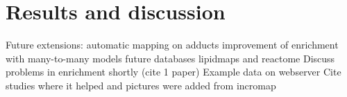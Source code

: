 \documentclass[final,5p,times,twocolumn]{elsarticle}
\begin{document}
\section{Results and discussion}

Future extensions: automatic mapping on adducts
improvement of enrichment with many-to-many models
future databases lipidmaps\cite{Sud2007} and reactome \cite{Eustachio2011}
Discuss problems in enrichment shortly (cite 1 paper)
Example data on webserver
Cite studies where it helped and pictures were added from incromap












\end{document}
